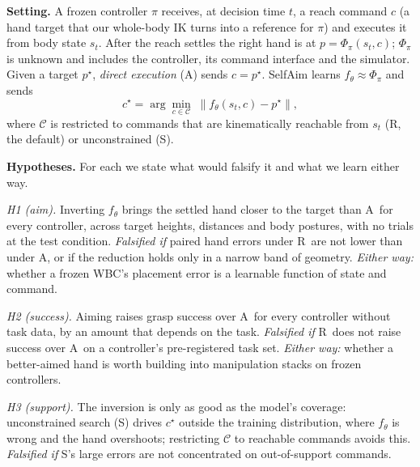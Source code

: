 \documentclass[conference]{IEEEtran}
\newcommand{\Ad}{\textsc{A}}       %
\newcommand{\Sinv}{\textsc{S}}     %
\newcommand{\Rr}{\textsc{R}}       %
\begin{document}
\textbf{Setting.} A frozen controller $\pi$ receives, at decision time $t$, a reach command $c$ (a hand target that our whole-body IK turns into a reference for $\pi$) and executes it from body state $s_t$. After the reach settles the right hand is at $p=\Phi_\pi(s_t,c)$; $\Phi_\pi$ is unknown and includes the controller, its command interface and the simulator. Given a target $p^\star$, \emph{direct execution} (\Ad) sends $c=p^\star$. SelfAim learns $f_\theta\approx\Phi_\pi$ and sends
\begin{equation}
c^\star=\arg\min_{c\in\mathcal{C}}\;\lVert f_\theta(s_t,c)-p^\star\rVert ,
\label{eq:inv}
\end{equation}
where $\mathcal{C}$ is restricted to commands that are kinematically reachable from $s_t$ (\Rr, the default) or unconstrained (\Sinv).

\textbf{Hypotheses.} For each we state what would falsify it and what we learn either way.

\emph{H1 (aim).} Inverting $f_\theta$ brings the settled hand closer to the target than \Ad\ for every controller, across target heights, distances and body postures, with no trials at the test condition. \emph{Falsified if} paired hand errors under \Rr\ are not lower than under \Ad, or if the reduction holds only in a narrow band of geometry. \emph{Either way:} whether a frozen WBC's placement error is a learnable function of state and command.

\emph{H2 (success).} Aiming raises grasp success over \Ad\ for every controller without task data, by an amount that depends on the task. \emph{Falsified if} \Rr\ does not raise success over \Ad\ on a controller's pre-registered task set. \emph{Either way:} whether a better-aimed hand is worth building into manipulation stacks on frozen controllers.

\emph{H3 (support).} The inversion is only as good as the model's coverage: unconstrained search (\Sinv) drives $c^\star$ outside the training distribution, where $f_\theta$ is wrong and the hand overshoots; restricting $\mathcal{C}$ to reachable commands avoids this. \emph{Falsified if} \Sinv's large errors are not concentrated on out-of-support commands.
\end{document}
